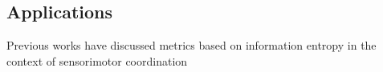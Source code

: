 \subsection{Applications}

Previous works have discussed metrics based on information entropy in the context of sensorimotor coordination \cite{Bonsignorio2020EntropyBasedMetrics}
%
%
%
